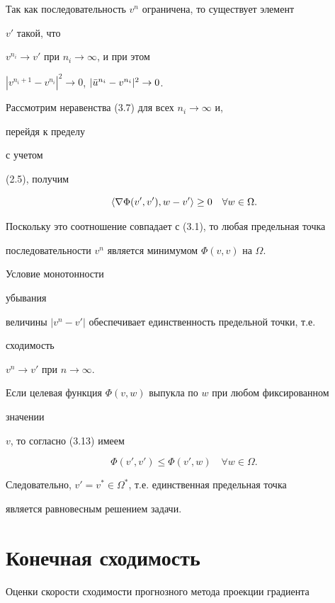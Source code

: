 \begin{pf}
Так как последовательность $v^n$ ограничена, то существует элемент


$v'$ такой, что


$v^{n_i}\to v'$ при $n_i\to\infty$, и при этом


$|v^{n_i+1}-v^{n_i}|^2\to 0$, $|\Bar u^{n_i}-v^{n_i}|^2\to 0$.





Рассмотрим неравенства (3.7) для всех $n_i\to\infty$ и,


перейдя к пределу


с учетом


(2.5), получим


$$


\la\nabla\Phi(v',v'),w-v'\ra\ge 0\quad \forall w\in\Omega.


$$


Поскольку это соотношение совпадает с (3.1), то любая предельная точка


последовательности $v^n$ является минимумом $\Phi(v,v)$ на $\Omega$.


Условие монотонности


убывания


величины $|v^n-v'|$ обеспечивает единственность предельной точки, т.е.


сходимость


$v^n\to v'$ при $n\to\infty$.





Если целевая функция $\Phi(v,w)$ выпукла по $w$ при любом фиксированном


значении


$v$, то согласно (3.13) имеем


$$


\Phi(v',v')\le \Phi(v',w)\quad \forall w\in \Omega.


$$


Следовательно, $v'=v^*\in \Omega^*$, т.е. единственная предельная точка


является равновесным решением задачи.


\end{pf}





\section{Конечная сходимость}


Оценки скорости сходимости прогнозного метода проекции градиента


